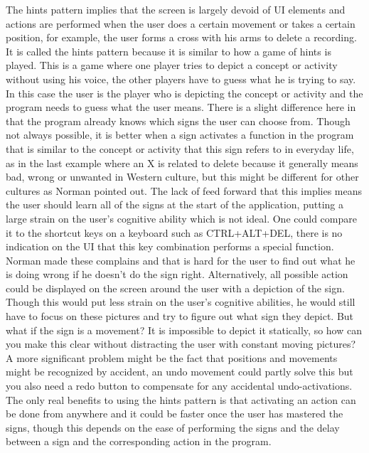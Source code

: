 The hints pattern implies that the screen is largely devoid of UI elements and actions are performed when the user does a certain movement or takes a certain position, for example, the user forms a cross with his arms to delete a recording. It is called the hints pattern because it is similar to how a game of hints is played. This is a game where one player tries to depict a concept or activity without using his voice, the other players have to guess what he is trying to say. In this case the user is the player who is depicting the concept or activity and the program needs to guess what the user means. There is a slight difference here in that the program already knows which signs the user can choose from. Though not always possible, it is better when a sign activates a function in the program that is similar to the concept or activity that this sign refers to in everyday life, as in the last example where an X is related to delete because it generally means bad, wrong or unwanted in Western culture, but this might be different for other cultures as Norman \cite{Norman2010} pointed out. The lack of feed forward that this implies means the user should learn all of the signs at the start of the application, putting a large strain on the user's cognitive ability which is not ideal. One could compare it to the shortcut keys on a keyboard such as CTRL+ALT+DEL, there is no indication on the UI that this key combination performs a special function. Norman \cite{Norman2010} made these complains and that is hard for the user to find out what he is doing wrong if he doesn't do the sign right. Alternatively, all possible action could be displayed on the screen around the user with a depiction of the sign. Though this would put less strain on the user's cognitive abilities, he would still have to focus on these pictures and try to figure out what sign they depict. But what if the sign is a movement? It is impossible to depict it statically, so how can you make this clear without distracting the user with constant moving pictures? A more significant problem might be the fact that positions and movements might be recognized by accident, an undo movement could partly solve this but you also need a redo button to compensate for any accidental undo-activations. The only real benefits to using the hints pattern is that activating an action can be done from anywhere and it could be faster once the user has mastered the signs, though this depends on the ease of performing the signs and the delay between a sign and the corresponding action in the program.\\

